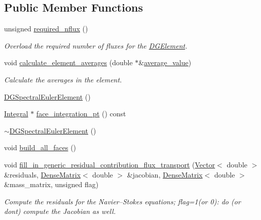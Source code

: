 \subsection*{Public Member Functions}
\begin{DoxyCompactItemize}
\item 
unsigned \hyperlink{classoomph_1_1DGSpectralEulerElement_3_011_00_01NNODE__1D_01_4_a8a7b3f093854cccf1cc12f1f9d381a54}{required\+\_\+nflux} ()
\begin{DoxyCompactList}\small\item\em Overload the required number of fluxes for the \hyperlink{classoomph_1_1DGElement}{D\+G\+Element}. \end{DoxyCompactList}\item 
void \hyperlink{classoomph_1_1DGSpectralEulerElement_3_011_00_01NNODE__1D_01_4_a7b5fa56b6e4bf604d6c3f21c126c0781}{calculate\+\_\+element\+\_\+averages} (double $\ast$\&\hyperlink{classoomph_1_1DGElement_a9349e3c349f9cf3b25bcb6121e86a7f2}{average\+\_\+value})
\begin{DoxyCompactList}\small\item\em Calculate the averages in the element. \end{DoxyCompactList}\item 
\hyperlink{classoomph_1_1DGSpectralEulerElement_3_011_00_01NNODE__1D_01_4_a092e44aa7ad9c9113d225d7513789e7c}{D\+G\+Spectral\+Euler\+Element} ()
\item 
\hyperlink{classoomph_1_1Integral}{Integral} $\ast$ \hyperlink{classoomph_1_1DGSpectralEulerElement_3_011_00_01NNODE__1D_01_4_a793f406d4ada6ec07389bbf74da445c2}{face\+\_\+integration\+\_\+pt} () const
\item 
\hyperlink{classoomph_1_1DGSpectralEulerElement_3_011_00_01NNODE__1D_01_4_afd1bee839d39cfb1f513d041b75d4c16}{$\sim$\+D\+G\+Spectral\+Euler\+Element} ()
\item 
void \hyperlink{classoomph_1_1DGSpectralEulerElement_3_011_00_01NNODE__1D_01_4_a79e06bb38c84bae756597dc885a687ac}{build\+\_\+all\+\_\+faces} ()
\item 
void \hyperlink{classoomph_1_1DGSpectralEulerElement_3_011_00_01NNODE__1D_01_4_ae0ae9526ab9aae474a1e834f32dc2580}{fill\+\_\+in\+\_\+generic\+\_\+residual\+\_\+contribution\+\_\+flux\+\_\+transport} (\hyperlink{classoomph_1_1Vector}{Vector}$<$ double $>$ \&residuals, \hyperlink{classoomph_1_1DenseMatrix}{Dense\+Matrix}$<$ double $>$ \&jacobian, \hyperlink{classoomph_1_1DenseMatrix}{Dense\+Matrix}$<$ double $>$ \&mass\+\_\+matrix, unsigned flag)
\begin{DoxyCompactList}\small\item\em Compute the residuals for the Navier--Stokes equations; flag=1(or 0)\+: do (or don\textquotesingle{}t) compute the Jacobian as well. \end{DoxyCompactList}\end{DoxyCompactItemize}
